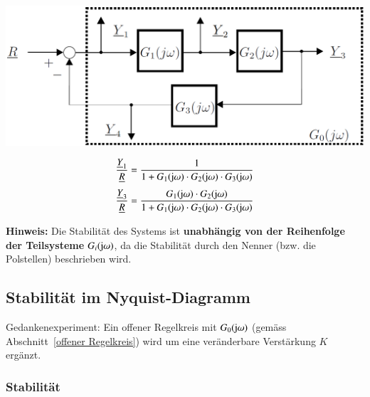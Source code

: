 \begin{minipage}[c]{0.5\columnwidth}
    \includegraphics[width=\columnwidth]{images/kreisschaltung_mehrere_bloecke.png}
\end{minipage}
\hfill
\begin{minipage}[c]{0.48\columnwidth}
    $$ \frac{\underline{Y}_1}{\underline{R}} = \frac{1}{1 + G_1(\mathrm{j} \omega) \cdot G_2(\mathrm{j} \omega) \cdot G_3(\mathrm{j} \omega)} $$
    $$ \frac{\underline{Y}_3}{\underline{R}} = \frac{G_1(\mathrm{j} \omega) \cdot G_2(\mathrm{j} \omega)}{1 + G_1(\mathrm{j} \omega) \cdot G_2(\mathrm{j} \omega) \cdot G_3(\mathrm{j} \omega)} $$
\end{minipage}

\vspace{0.2cm}
\textbf{Hinweis:} Die Stabilität des Systems ist \textbf{unabhängig von der Reihenfolge der Teilsysteme} $G_{i}(\mathrm{j} \omega)$,
da die Stabilität durch den Nenner (bzw. die Polstellen) beschrieben wird.


\subsection{Stabilität im Nyquist-Diagramm}

Gedankenexperiment: Ein offener Regelkreis mit $G_0(\mathrm{j} \omega)$ (gemäss Abschnitt~\ref{offener Regelkreis}) wird um eine 
veränderbare Verstärkung $K$ ergänzt.


\subsubsection{Stabilität}


